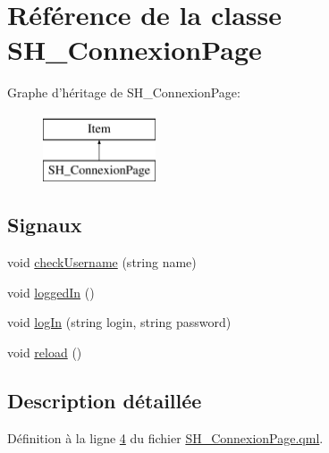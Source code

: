 \hypertarget{classSH__ConnexionPage}{\section{Référence de la classe S\-H\-\_\-\-Connexion\-Page}
\label{classSH__ConnexionPage}
}
Graphe d'héritage de S\-H\-\_\-\-Connexion\-Page\-:\begin{figure}[H]
\begin{center}
\leavevmode
\includegraphics[height=2.000000cm]{classSH__ConnexionPage}
\end{center}
\end{figure}
\subsection*{Signaux}
\begin{DoxyCompactItemize}
\item 
void \hyperlink{classSH__ConnexionPage_a3d6fc8c024e382ed18d1af79ce6c3ca9}{check\-Username} (string name)
\item 
void \hyperlink{classSH__ConnexionPage_a0fcb9a27a635a132af3dae8ea5f27940}{logged\-In} ()
\item 
void \hyperlink{classSH__ConnexionPage_a0d05690176da749882ac537a008f889f}{log\-In} (string login, string password)
\item 
void \hyperlink{classSH__ConnexionPage_a0ae2e9c969961ef79b8a4e3153cc53e0}{reload} ()
\end{DoxyCompactItemize}


\subsection{Description détaillée}


Définition à la ligne \hyperlink{SH__ConnexionPage_8qml_source_l00004}{4} du fichier \hyperlink{SH__ConnexionPage_8qml_source}{S\-H\-\_\-\-Connexion\-Page.\-qml}.



